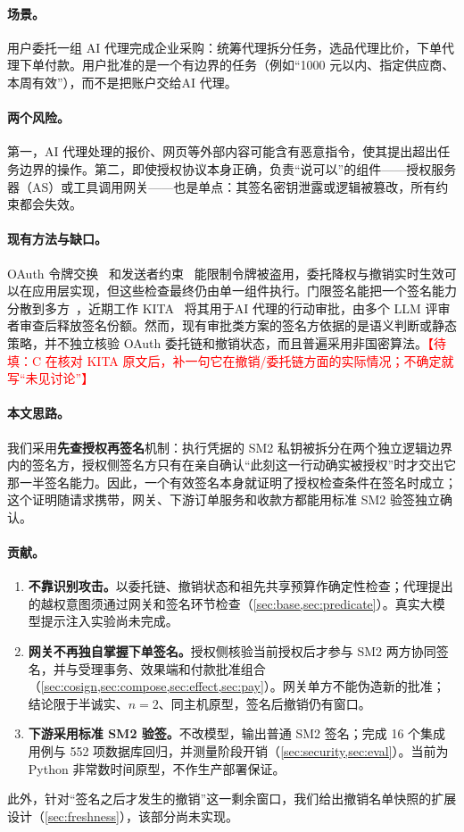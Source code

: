 \documentclass[UTF8,zihao=-4,a4paper]{ctexart}
\newcommand{\fillme}[1]{\textcolor{red}{【待填：#1】}}
\theoremstyle{plain}
\theoremstyle{definition}
\theoremstyle{remark}
\begin{document}
\paragraph{场景。}用户委托一组 AI 代理完成企业采购：统筹代理拆分任务，选品代理比价，下单代理下单付款。用户批准的是一个有边界的任务（例如“1000 元以内、指定供应商、本周有效”），而不是把账户交给AI 代理。

\paragraph{两个风险。}第一，AI 代理处理的报价、网页等外部内容可能含有恶意指令，使其提出超出任务边界的操作。第二，即使授权协议本身正确，负责“说可以”的组件——授权服务器（AS）或工具调用网关——也是单点：其签名密钥泄露或逻辑被篡改，所有约束都会失效。

\paragraph{现有方法与缺口。}OAuth 令牌交换~\cite{rfc8693} 和发送者约束~\cite{rfc9449} 能限制令牌被盗用，委托降权与撤销实时生效可以在应用层实现，但这些检查最终仍由单一组件执行。门限签名能把一个签名能力分散到多方~\cite{frost,rfc9591}，近期工作 KITA~\cite{kita} 将其用于AI 代理的行动审批，由多个 LLM 评审者审查后释放签名份额。然而，现有审批类方案的签名方依据的是语义判断或静态策略，并不独立核验 OAuth 委托链和撤销状态，而且普遍采用非国密算法。\fillme{C 在核对 KITA 原文后，补一句它在撤销/委托链方面的实际情况；不确定就写“未见讨论”}

\paragraph{本文思路。}我们采用\textbf{先查授权再签名}机制：执行凭据的 SM2 私钥被拆分在两个独立逻辑边界内的签名方，授权侧签名方只有在亲自确认“此刻这一行动确实被授权”时才交出它那一半签名能力。因此，一个有效签名本身就证明了授权检查条件在签名时成立；这个证明随请求携带，网关、下游订单服务和收款方都能用标准 SM2 验签独立确认。

\paragraph{贡献。}
\begin{enumerate}[leftmargin=2em,itemsep=2pt]
\item \textbf{不靠识别攻击。}以委托链、撤销状态和祖先共享预算作确定性检查；代理提出的越权意图须通过网关和签名环节检查（\cref{sec:base,sec:predicate}）。真实大模型提示注入实验尚未完成。
\item \textbf{网关不再独自掌握下单签名。}授权侧核验当前授权后才参与 SM2 两方协同签名，并与受理事务、效果端和付款批准组合（\cref{sec:cosign,sec:compose,sec:effect,sec:pay}）。网关单方不能伪造新的批准；结论限于半诚实、$n=2$、同主机原型，签名后撤销仍有窗口。
\item \textbf{下游采用标准 SM2 验签。}不改模型，输出普通 SM2 签名；完成 16 个集成用例与 552 项数据库回归，并测量阶段开销（\cref{sec:security,sec:eval}）。当前为 Python 非常数时间原型，不作生产部署保证。
\end{enumerate}
此外，针对“签名之后才发生的撤销”这一剩余窗口，我们给出撤销名单快照的扩展设计（\cref{sec:freshness}），该部分尚未实现。
\end{document}
